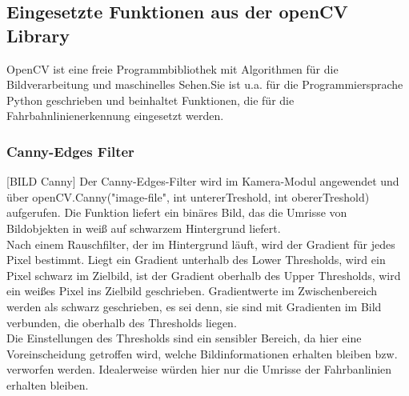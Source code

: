 \subsection{Eingesetzte Funktionen aus der openCV Library}
\glqq OpenCV ist eine freie Programmbibliothek mit Algorithmen für die 
Bildverarbeitung und maschinelles Sehen.\grqq Sie ist u.a. für die
Programmiersprache Python geschrieben und beinhaltet Funktionen, die für die
Fahrbahnlinienerkennung eingesetzt werden.\\
\subsubsection{Canny-Edges Filter}
[BILD Canny]
Der Canny-Edges-Filter wird im Kamera-Modul angewendet und über
openCV.Canny("image-file", int untererTreshold, int obererTreshold)
aufgerufen. Die Funktion liefert ein binäres Bild, das die Umrisse
von Bildobjekten in weiß auf schwarzem Hintergrund liefert.\\
Nach einem Rauschfilter, der im Hintergrund läuft, wird der Gradient
für jedes Pixel bestimmt. Liegt ein Gradient unterhalb des Lower Thresholds,
wird ein Pixel schwarz im Zielbild, ist der Gradient oberhalb des Upper
Thresholds, wird ein weißes Pixel ins Zielbild geschrieben. Gradientwerte im
Zwischenbereich werden als schwarz geschrieben, es sei denn, sie sind mit
Gradienten im Bild verbunden, die oberhalb des Thresholds liegen.\\
Die Einstellungen des Thresholds sind ein sensibler Bereich, da hier eine
Voreinscheidung getroffen wird, welche Bildinformationen erhalten bleiben bzw.
verworfen werden. Idealerweise würden hier nur die Umrisse der Fahrbanlinien
erhalten bleiben.\\

